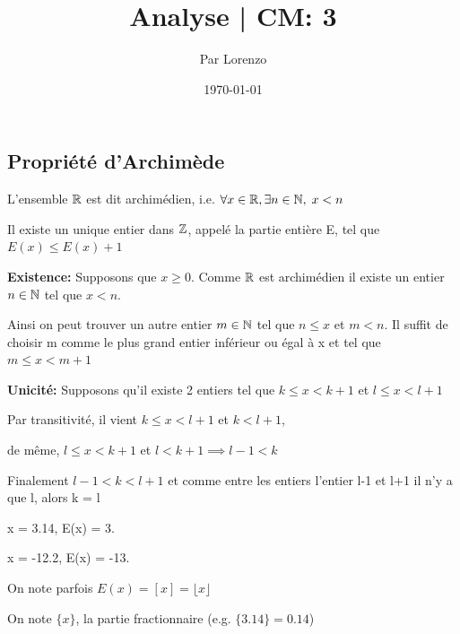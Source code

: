 \documentclass[a4paper, 12pt]{article}
\title{Analyse | CM: 3}
\author{Par Lorenzo}
\date{\today}
\begin{document}
\maketitle

\subsection{Propriété d'Archimède}

L'ensemble $\mathbb{R}$ est dit archimédien, i.e. $\forall x \in \mathbb{R}, \exists n \in \mathbb{N}, \; x < n$

\begin{proposition}
    Il existe un unique entier dans $\mathbb{Z}$, appelé la partie entière E, tel que $E(x) \leq E(x) + 1$
\end{proposition}

\begin{demonstration}
    \textbf{Existence:} Supposons que $x \geq 0$.
    Comme $\mathbb{R}$ est archimédien il existe un entier $n \in \mathbb{N}$ tel que $x \lt n$.

    \begin{rdem}
        Ainsi on peut trouver un autre entier $m \in \mathbb{N}$ tel que $n \leq x$ et $m \lt n$.
        Il suffit de choisir m comme le plus grand entier inférieur ou égal à x et tel que $m \leq x \lt m + 1$
    \end{rdem}

    \vspace{1em}

    \noindent
    \textbf{Unicité:} Supposons qu'il existe 2 entiers tel que $k \leq x \lt k + 1$ et $l \leq x \lt l + 1$

    Par transitivité, il vient $k \leq x \lt l + 1$ et $k \lt l + 1$,

    de même, $l \leq x \lt k + 1$ et $l \lt k + 1 \implies l - 1 \lt k$

    \begin{rdem}
        Finalement $l - 1 \lt k \lt l + 1$ et comme entre les entiers l'entier l-1 et l+1 il n'y a que l, alors k = l
    \end{rdem}
\end{demonstration}

\begin{example}
    \item x = 3.14, E(x) = 3.
    \item x = -12.2, E(x) = -13.
\end{example}

\begin{remark}
    \item On note parfois $E(x) = [x] = \lfloor x \rfloor$
    \item On note $\{x\}$, la partie fractionnaire (e.g. $\{3.14\}=0.14$)
\end{remark}
\end{document}
